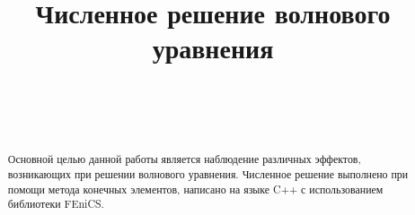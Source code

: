 \documentclass[
11pt,%
tightenlines,%
twoside,%
onecolumn,%
nofloats,%
nobibnotes,%
nofootinbib,%
superscriptaddress,%
noshowpacs,%
centertags]%
{revtex4}
\begin{document}

\title{Численное решение волнового уравнения}

\author{~}

\author{~}




\begin{abstract} %
Основной целью данной работы является наблюдение различных эффектов, возникающих при решении волнового
уравнения. Численное решение выполнено при помощи метода конечных элементов, написано на языке C++ 
с использованием библиотеки FEniCS. 


\end{abstract}



\maketitle

\end{document}
